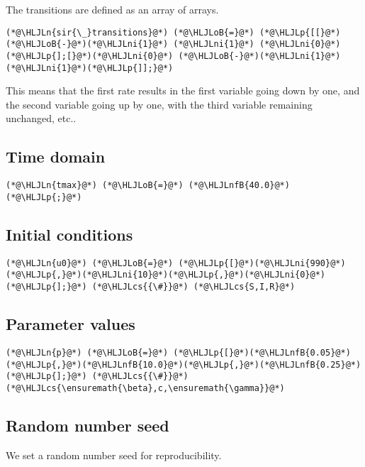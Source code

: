 \documentclass[12pt,a4paper]{article}
\newcommand{\HLJLn}[1]{#1}
\newcommand{\HLJLnfB}[1]{\textcolor[RGB]{59,151,46}{#1}}
\newcommand{\HLJLni}[1]{\textcolor[RGB]{59,151,46}{#1}}
\newcommand{\HLJLoB}[1]{\textcolor[RGB]{102,102,102}{\textbf{#1}}}
\newcommand{\HLJLp}[1]{#1}
\newcommand{\HLJLcs}[1]{\textcolor[RGB]{153,153,119}{\textit{#1}}}
\begin{document}
The transitions are defined as an array of arrays.


\begin{lstlisting}
(*@\HLJLn{sir{\_}transitions}@*) (*@\HLJLoB{=}@*) (*@\HLJLp{[[}@*)(*@\HLJLoB{-}@*)(*@\HLJLni{1}@*) (*@\HLJLni{1}@*) (*@\HLJLni{0}@*)(*@\HLJLp{];[}@*)(*@\HLJLni{0}@*) (*@\HLJLoB{-}@*)(*@\HLJLni{1}@*) (*@\HLJLni{1}@*)(*@\HLJLp{]];}@*)
\end{lstlisting}


This means that the first rate results in the first variable going down by one, and the second variable going up by one, with the third variable remaining unchanged, etc..

\subsection{Time domain}

\begin{lstlisting}
(*@\HLJLn{tmax}@*) (*@\HLJLoB{=}@*) (*@\HLJLnfB{40.0}@*)(*@\HLJLp{;}@*)
\end{lstlisting}


\subsection{Initial conditions}

\begin{lstlisting}
(*@\HLJLn{u0}@*) (*@\HLJLoB{=}@*) (*@\HLJLp{[}@*)(*@\HLJLni{990}@*)(*@\HLJLp{,}@*)(*@\HLJLni{10}@*)(*@\HLJLp{,}@*)(*@\HLJLni{0}@*)(*@\HLJLp{];}@*) (*@\HLJLcs{{\#}}@*) (*@\HLJLcs{S,I,R}@*)
\end{lstlisting}


\subsection{Parameter values}

\begin{lstlisting}
(*@\HLJLn{p}@*) (*@\HLJLoB{=}@*) (*@\HLJLp{[}@*)(*@\HLJLnfB{0.05}@*)(*@\HLJLp{,}@*)(*@\HLJLnfB{10.0}@*)(*@\HLJLp{,}@*)(*@\HLJLnfB{0.25}@*)(*@\HLJLp{];}@*) (*@\HLJLcs{{\#}}@*) (*@\HLJLcs{\ensuremath{\beta},c,\ensuremath{\gamma}}@*)
\end{lstlisting}


\subsection{Random number seed}
We set a random number seed for reproducibility.
\end{document}
